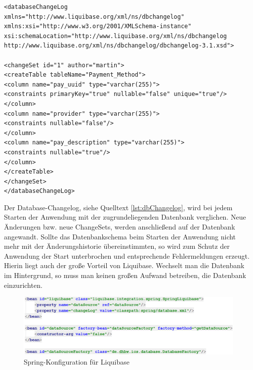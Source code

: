 \begin{lstlisting}[caption={Database-Changelog Liquibase}, label={lst:dbChangelog}]
<databaseChangeLog
xmlns="http://www.liquibase.org/xml/ns/dbchangelog"
xmlns:xsi="http://www.w3.org/2001/XMLSchema-instance"
xsi:schemaLocation="http://www.liquibase.org/xml/ns/dbchangelog   
http://www.liquibase.org/xml/ns/dbchangelog/dbchangelog-3.1.xsd">

<changeSet id="1" author="martin">
<createTable tableName="Payment_Method">
<column name="pay_uuid" type="varchar(255)">
<constraints primaryKey="true" nullable="false" unique="true"/>
</column>
<column name="provider" type="varchar(255)">
<constraints nullable="false"/>
</column>
<column name="pay_description" type="varchar(255)">
<constraints nullable="true"/>
</column>
</createTable>
</changeSet>
</databaseChangeLog>
\end{lstlisting}

Der Database-Changelog, siehe Quelltext \ref{lst:dbChangelog}, wird bei jedem Starten der Anwendung mit der zugrundeliegenden Datenbank verglichen. Neue Änderungen bzw. neue ChangeSets, werden anschließend auf der Datenbank angewandt. Sollte das Datenbankschema beim Starten der Anwendung nicht mehr mit der Änderungshistorie übereinstimmten, so wird zum Schutz der Anwendung der Start unterbrochen und entsprechende Fehlermeldungen erzeugt. Hierin liegt auch der große Vorteil von Liquibase. Wechselt man die Datenbank im Hintergrund, so muss man keinen großen Aufwand betreiben, die Datenbank einzurichten. 

\begin{figure}[H]
	\centering 
	\includegraphics[width=\textwidth]{img/liquibase_beans}
	\captionsetup{format=hang}
	\caption[Spring-Konfiguration für Liquibase]{\label{fig:liquibase_spring}Spring-Konfiguration für Liquibase}
\end{figure}

